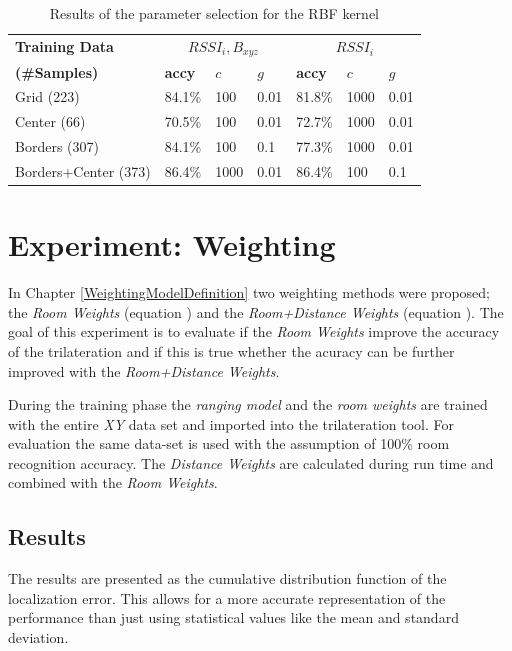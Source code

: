 \begin{table}
\centering
\begin{tabular}{l l l l l l l}
\toprule
\textbf{Training Data}&\multicolumn{3}{c}{\boldmath$RSSI_{i},B_{xyz}$}&\multicolumn{3}{c}{\boldmath$RSSI_{i}$}\\
\textbf{(\#Samples)}&\textbf{accy}&$c$&$g$&\textbf{accy}&$c$&$g$\\
\midrule
Grid (223)&84.1\%&100&0.01&81.8\%&1000&0.01\\
Center (66)&70.5\%&100&0.01&72.7\%&1000&0.01\\
Borders (307)&84.1\%&100&0.1&77.3\%&1000&0.01\\
Borders+Center (373)&86.4\%&1000&0.01&86.4\%&100&0.1\\
\bottomrule
\end{tabular}
\caption[Room Recognition - RBF kernel parameter selection]{Results of the parameter selection for the RBF kernel}
\label{tab:SVMconfigurationRBF}
\end{table}

\section{Experiment: Weighting}
\label{ExperimentWeighting}

In Chapter \ref{WeightingModelDefinition} two weighting methods were proposed; the \emph{Room Weights} (equation ) and the \emph{Room+Distance Weights} (equation ). The goal of this experiment is to evaluate if the \emph{Room Weights} improve the accuracy of the trilateration and if this is true whether the acuracy can be further improved with the \emph{Room+Distance Weights}.

During the training phase the \emph{ranging model} and the \emph{room weights} are trained with the entire \emph{XY} data set and imported into the trilateration tool. For evaluation the same data-set is used with the assumption of 100\% room recognition accuracy. The \emph{Distance Weights} are calculated during run time and combined with the \emph{Room Weights}.

\subsection{Results}
The results are presented as the cumulative distribution function of the localization error. This allows for a more accurate representation of the performance than just using statistical values like the mean and standard deviation.

